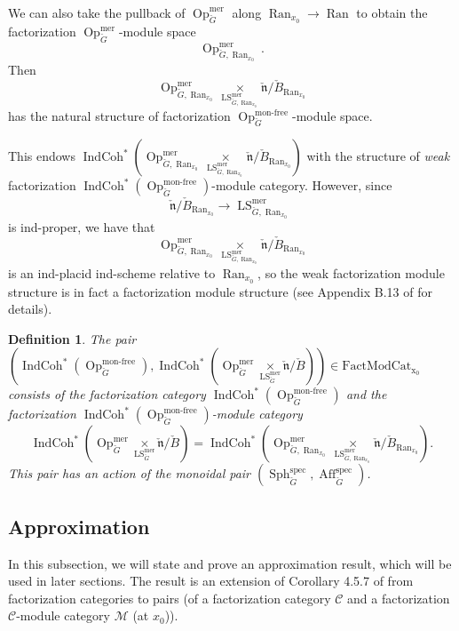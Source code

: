 \documentclass[10pt]{amsart}
\newtheorem{defn}[subsubsection]{Definition}
\theoremstyle{remark}
\newcommand{\on}[1]{\operatorname{#1}}
\newcommand{\IndCoh}{\on{IndCoh}}
\newcommand{\Gcheck}{\check{G}}
\newcommand{\ncheck}{\check{\mathfrak{n}}}
\newcommand{\Bcheck}{\check{B}}
\newcommand{\Ran}{\on{Ran}}
\newcommand{\FactModCat}{\on{FactModCat_{x_0}}}
\newcommand{\sssec}[1]{\subsubsection{}}
\begin{document}
\sssec{}
We can also take the pullback of $\on{Op}_{\Gcheck}^{\on{mer}}$ along $\Ran_{x_0} \to \Ran$ to obtain the factorization $\on{Op}_{\Gcheck}^{\on{mer}}$-module space
$$
\on{Op}_{\Gcheck, \on{Ran}_{x_0}}^{\on{mer}}.
$$
Then
$$
\on{Op}_{\Gcheck, \on{Ran}_{x_0}}^{\on{mer}} \underset{\on{LS}_{\Gcheck, \on{Ran}_{x_0}}^{\on{mer}}}{\times} \ncheck/\Bcheck_{\Ran_{x_0}}
$$
has the natural structure of factorization $\on{Op}_{\Gcheck}^{\on{mon-free}}$-module space.

This endows $\on{IndCoh}^*(\on{Op}_{\Gcheck, \on{Ran}_{x_0}}^{\on{mer}} \underset{\on{LS}_{\Gcheck, \on{Ran}_{x_0}}^{\on{mer}}}{\times} \ncheck/\Bcheck_{\Ran_{x_0}})$ with the structure of \emph{weak} factorization $\IndCoh^*(\on{Op}_{\Gcheck}^{\on{mon-free}})$-module category. However, since 
$$
\ncheck/\Bcheck_{\Ran_{x_0}} \longrightarrow \on{LS}_{\Gcheck, \on{Ran}_{x_0}}^{\on{mer}}
$$
is ind-proper, we have that
$$
\on{Op}_{\Gcheck, \on{Ran}_{x_0}}^{\on{mer}} \underset{\on{LS}_{\Gcheck, \on{Ran}_{x_0}}^{\on{mer}}}{\times} \ncheck/\Bcheck_{\Ran_{x_0}}
$$
is an ind-placid ind-scheme relative to $\Ran_{x_0}$, so the weak factorization module structure is in fact a factorization module structure (see Appendix B.13 of \cite{GLC2} for details).

\begin{defn}
    The pair $(\IndCoh^*(\on{Op}_{\Gcheck}^{\on{mon-free}}), \IndCoh^*(\on{Op}_{\Gcheck}^{\on{mer}} \underset{\on{LS}_{\Gcheck}^{\on{mer}}}{\times} \ncheck/\Bcheck)) \in \FactModCat$ consists of the factorization category $\IndCoh^*(\on{Op}_{\Gcheck}^{\on{mon-free}})$ and the factorization $\IndCoh^*(\on{Op}_{\Gcheck}^{\on{mon-free}})$-module category
    $$
    \IndCoh^*(\on{Op}_{\Gcheck}^{\on{mer}} \underset{\on{LS}_{\Gcheck}^{\on{mer}}}{\times} \ncheck/\Bcheck) = \IndCoh^*(\on{Op}_{\Gcheck, \Ran_{x_0}}^{\on{mer}} \underset{\on{LS}_{\Gcheck, \Ran_{x_0}}^{\on{mer}}}{\times} \ncheck/\Bcheck_{\Ran_{x_0}}).
    $$
    This pair has an action of the monoidal pair $(\on{Sph}_{\Gcheck}^{\on{spec}}, \on{Aff}_{\Gcheck}^{\on{spec}})$.
\end{defn}


\subsection{Approximation} \label{Approximation}
In this subsection, we will state and prove an approximation result, which will be used in later sections. The result is an extension of Corollary 4.5.7 of \cite{GLC2} from factorization categories to pairs (of a factorization category $\mathcal{C}$ and a factorization $\mathcal{C}$-module category $\mathcal{M}$ (at $x_0$)).
\end{document}

